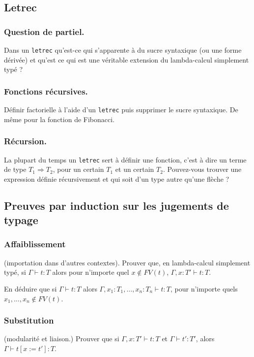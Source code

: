 \documentclass[11pt, a4paper]{article}
\begin{document}
\subsection{Letrec}
\label{sec:org4ad5f32}
\subsubsection{Question de partiel.}
\label{sec:orge2a9fe2}
Dans un \texttt{letrec} qu'est-ce qui s'apparente à du sucre syntaxique (ou une
forme dérivée) et qu'est ce qui est une véritable extension du
lambda-calcul simplement typé ?
\subsubsection{Fonctions récursives.}
\label{sec:org86d1dcc}
Définir factorielle à l'aide d'un \texttt{letrec} puis supprimer le sucre
syntaxique. De même pour la fonction de Fibonacci.

\subsubsection{Récursion.}
\label{sec:orgc8dafbd}
La plupart du temps un \texttt{letrec} sert à définir une fonction, c'est à
dire un terme de type \(T_1\Rightarrow T_2\), pour un certain \(T_1\) et un
certain \(T_2\). Pouvez-vous trouver une expression définie
récursivement et qui soit d'un type autre qu'une flèche ?

\subsection{Preuves par induction sur les jugements de typage}
\label{sec:org3f9171e}
\subsubsection{Affaiblissement}
\label{sec:org8bb73ba}
(importation dans d'autres contextes).
Prouver que, en lambda-calcul simplement typé, si \(\Gamma\vdash t: T\)
alors pour n'importe quel \(x\not\in FV(t)\), \(\Gamma, x:T'\vdash t: T\).

En déduire que si \(\Gamma\vdash t: T\)
alors \(\Gamma,
x_1:T_1, \ldots, x_n:T_n\vdash t: T\),  pour n'importe quels
\(x_1,\ldots,x_n\not\in FV(t)\).

\subsubsection{Substitution}
\label{sec:orgbd1f1f1}
(modularité et liaison.)
Prouver que si \(\Gamma, x : T' \vdash t : T\) et \(\Gamma \vdash t' :
T'\), alors \(\Gamma \vdash t[x:=t'] : T\).
\end{document}
